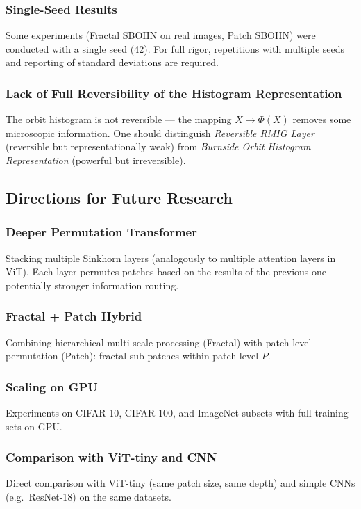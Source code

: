 \documentclass[11pt,a4paper]{report}
\begin{document}
\subsubsection{Single-Seed Results}
Some experiments (Fractal SBOHN on real images, Patch SBOHN) were conducted with a single seed (42).  For full rigor, repetitions with multiple seeds and reporting of standard deviations are required.

\subsubsection{Lack of Full Reversibility of the Histogram Representation}
The orbit histogram is not reversible --- the mapping $X\to\Phi(X)$ removes some microscopic information.  One should distinguish \emph{Reversible RMIG Layer} (reversible but representationally weak) from \emph{Burnside Orbit Histogram Representation} (powerful but irreversible).

\subsection{Directions for Future Research}

\subsubsection{Deeper Permutation Transformer}
Stacking multiple Sinkhorn layers (analogously to multiple attention layers in ViT).  Each layer permutes patches based on the results of the previous one --- potentially stronger information routing.

\subsubsection{Fractal + Patch Hybrid}
Combining hierarchical multi-scale processing (Fractal) with patch-level permutation (Patch):
fractal sub-patches within patch-level $P$.

\subsubsection{Scaling on GPU}
Experiments on CIFAR-10, CIFAR-100, and ImageNet subsets with full training sets on GPU.

\subsubsection{Comparison with ViT-tiny and CNN}
Direct comparison with ViT-tiny (same patch size, same depth) and simple CNNs (e.g.\ ResNet-18) on the same datasets.
\end{document}
